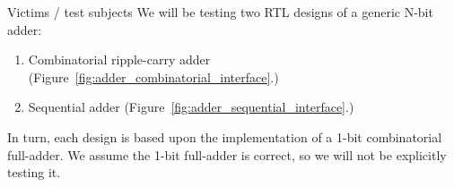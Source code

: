 \documentclass[a4paper, 12pt, onecolumn]{article}
\begin{document}
\clearpage

\begin{section}{Victims / test subjects}
    We will be testing two RTL designs of a generic N-bit adder:

    \begin{enumerate}
        \item Combinatorial ripple-carry adder (Figure~\ref{fig:adder_combinatorial_interface}.)
        \item Sequential adder (Figure~\ref{fig:adder_sequential_interface}.)
    \end{enumerate}

    In turn, each design is based upon the implementation of a 1-bit combinatorial full-adder. We assume the 1-bit full-adder is correct, so we will not be explicitly testing it.


\end{section}
\end{document}
